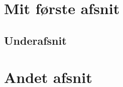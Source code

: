 \documentclass[12pt]{article}
\begin{document}
\section{Mit første afsnit}

\lipsum[1-4]
\subsection{Underafsnit}
\lipsum[1-1]
\section{Andet afsnit}


\kant[1-2]
\end{document}
